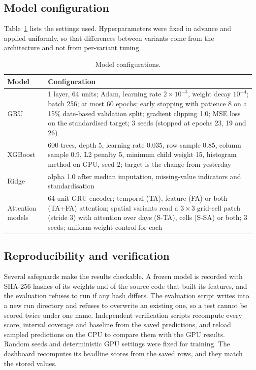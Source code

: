\documentclass[pdflatex,sn-mathphys-num]{sn-jnl}
\begin{document}
\subsection{Model configuration}
Table~\ref{tab:config} lists the settings used. Hyperparameters were fixed in advance and applied uniformly, so that differences between variants come from the architecture and not from per-variant tuning.

\begin{table}[!htbp]
\centering
\small
\caption{Model configurations.}\label{tab:config}
\begin{tabular}{lp{8.2cm}}
\toprule
\textbf{Model} & \textbf{Configuration} \\
\midrule
GRU & 1 layer, 64 units; Adam, learning rate $2\times10^{-3}$, weight decay $10^{-4}$; batch 256; at most 60 epochs; early stopping with patience 8 on a 15\% date-based validation split; gradient clipping 1.0; MSE loss on the standardised target; 3 seeds (stopped at epochs 23, 19 and 26) \\
XGBoost & 600 trees, depth 5, learning rate 0.035, row sample 0.85, column sample 0.9, L2 penalty 5, minimum child weight 15, histogram method on GPU, seed 2; target is the change from yesterday \\
Ridge & alpha 1.0 after median imputation, missing-value indicators and standardisation \\
Attention models & 64-unit GRU encoder; temporal (TA), feature (FA) or both (TA+FA) attention; spatial variants read a $3\times3$ grid-cell patch (stride 3) with attention over days (S-TA), cells (S-SA) or both; 3 seeds; uniform-weight control for each \\
\bottomrule
\end{tabular}
\end{table}

\subsection{Reproducibility and verification}
Several safeguards make the results checkable. A frozen model is recorded with SHA-256 hashes of its weights and of the source code that built its features, and the evaluation refuses to run if any hash differs. The evaluation script writes into a new run directory and refuses to overwrite an existing one, so a test cannot be scored twice under one name. Independent verification scripts recompute every score, interval coverage and baseline from the saved predictions, and reload sampled predictions on the CPU to compare them with the GPU results. Random seeds and deterministic GPU settings were fixed for training. The dashboard recomputes its headline scores from the saved rows, and they match the stored values.
\end{document}
